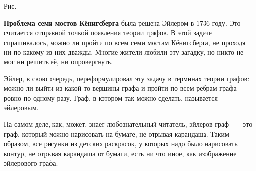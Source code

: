 \begin{example}
\begin{paracol}{2}
\begin{center}

	\small Рис. \images
\end{center}\end{paracol}\end{example}


	\textbf{Проблема семи мостов Кёнигсберга} была решена Эйлером в $1736$ году. Это считается отправной точкой появления теории графов. В этой задаче спрашивалось, можно ли пройти по всем семи мостам Кёнигсберга, не проходя ни по какому из них дважды. Многие жители любили эту загадку, но никто не мог ни решить её, ни опровергнуть. 
	
	Эйлер, в свою очередь, переформулировал эту задачу в терминах теории графов: можно ли выйти из какой-то вершины графа и пройти по всем ребрам графа ровно по одному разу. Граф, в котором так можно сделать, называется эйлеровым. 

	На самом деле, как, может, знает любознательный читатель, эйлеров граф~---~это граф, который можно нарисовать на бумаге, не отрывая карандаша. Таким образом, все рисунки из детских раскрасок, у которых надо было нарисовать контур, не отрывая карандаша от бумаги, есть ни что иное, как изображение эйлерового графа. 

